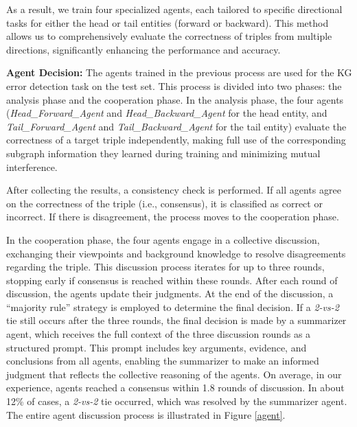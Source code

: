As a result, we train four specialized agents, each tailored to specific directional tasks for either the head or tail entities (forward or backward). This method allows us to comprehensively evaluate the correctness of triples from multiple directions, significantly enhancing the performance and accuracy.



\textbf{Agent Decision: }
%
The agents trained in the previous process are used for the KG error detection task on the test set. This process is divided into two phases: the analysis phase and the cooperation phase. In the analysis phase, the four agents (\textit{Head\_Forward\_Agent} and \textit{Head\_Backward\_Agent} for the head entity, and \textit{Tail\_Forward\_Agent} and \textit{Tail\_Backward\_Agent} for the tail entity) evaluate the correctness of a target triple independently, making full use of the corresponding subgraph information they learned during training and minimizing mutual interference.

After collecting the results, a consistency check is performed. If all agents agree on the correctness of the triple (i.e., consensus), it is classified as correct or incorrect. If there is disagreement, the process moves to the cooperation phase.

In the cooperation phase, the four agents engage in a collective discussion, exchanging their viewpoints and background knowledge to resolve disagreements regarding the triple. This discussion process iterates for up to three rounds, stopping early if consensus is reached within these rounds. After each round of discussion, the agents update their judgments. At the end of the discussion, a ``majority rule'' strategy is employed to determine the final decision. If a \textit{2-vs-2} tie still occurs after the three rounds, 
the final decision is made by a summarizer agent, which receives the full context of the three discussion rounds as a structured prompt. This prompt includes key arguments, evidence, and conclusions from all agents, enabling the summarizer to make an informed judgment that reflects the collective reasoning of the agents.
On average, in our experience, agents reached a consensus within 1.8 rounds of discussion. In about 12\% of cases, a \textit{2-vs-2} tie occurred, which was resolved by the summarizer agent.
The entire agent discussion process is illustrated in Figure \ref{agent}.

